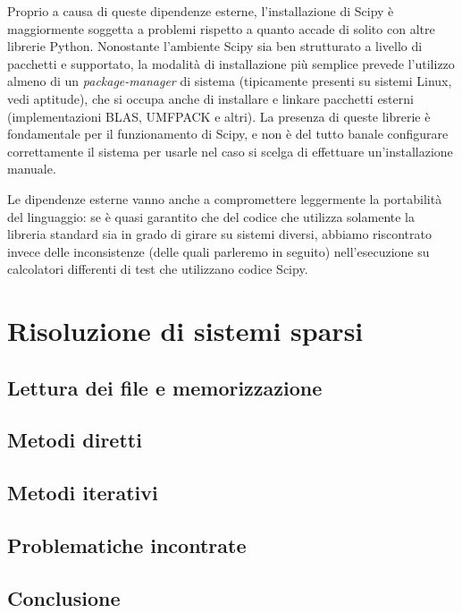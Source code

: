 \documentclass[11pt,a4paper]{scrartcl}
\begin{document}
Proprio a causa di queste dipendenze esterne, l'installazione di Scipy è maggiormente soggetta a problemi rispetto a quanto accade di solito con altre librerie Python. Nonostante l'ambiente Scipy sia ben strutturato a livello di pacchetti e supportato, la modalità di installazione più semplice prevede l'utilizzo almeno di un \emph{package-manager} di sistema (tipicamente presenti su sistemi Linux, vedi aptitude), che si occupa anche di installare e linkare pacchetti esterni (implementazioni BLAS, UMFPACK e altri). La presenza di queste librerie è fondamentale per il funzionamento di Scipy, e non è del tutto banale configurare correttamente il sistema per usarle nel caso si scelga di effettuare un'installazione manuale.

Le dipendenze esterne vanno anche a compromettere leggermente la portabilità del linguaggio: se è quasi garantito che del codice che utilizza solamente la libreria standard sia in grado di girare su sistemi diversi, abbiamo riscontrato invece delle inconsistenze (delle quali parleremo in seguito) nell'esecuzione su calcolatori differenti di test che utilizzano codice Scipy. 




\section*{Risoluzione di sistemi sparsi}

\subsection*{Lettura dei file e memorizzazione}

\subsection*{Metodi diretti}

\subsection*{Metodi iterativi}

\subsection*{Problematiche incontrate}

\subsection*{Conclusione}
\end{document}
